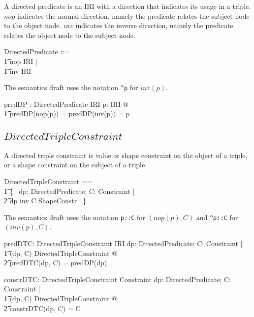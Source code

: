 \documentclass{article}
\begin{document}
A directed predicate is an IRI with a direction that indicates its usage in a triple. 
$nop$ indicates the normal direction, namely the predicate relates the subject node to the object node. 
$inv$ indicates the inverse direction, namely the predicate relates the object node to the subject node.
\begin{zed}
	DirectedPredicate ::= \\
\t1		nop \ldata IRI \rdata | \\
\t1		inv \ldata IRI \rdata
\end{zed}

The semantics draft uses the notation {\tt \verb+^+p} for $inv(p)$.

\begin{axdef}
	predDP : DirectedPredicate \fun IRI
\where
	\forall p: IRI @ \\
\t1		predDP(nop(p)) = predDP(inv(p)) = p
\end{axdef}

\subsection{$DirectedTripleConstraint$}
A directed triple constraint is value or shape constraint on the object of a triple, or a shape constraint on the subject of a triple.
\begin{zed}
	DirectedTripleConstraint == \\
\t1		\{~ dp: DirectedPredicate; C: Constraint | \\
\t2			dp \in \ran inv \implies C \in ShapeConstr ~\}
\end{zed}

The semantics draft uses the notation {\tt p::C} for $(nop(p),C)$ and {\tt \verb+^+p::C} for $(inv(p),C)$.

\begin{axdef}
	predDTC: DirectedTripleConstraint \fun IRI
\where
	\forall dp: DirectedPredicate; C: Constraint | \\
\t1		(dp, C) \in DirectedTripleConstraint @ \\
\t2			predDTC(dp, C) = predDP(dp)
\end{axdef}

\begin{axdef}
	constrDTC: DirectedTripleConstraint \fun Constraint
\where
	\forall dp: DirectedPredicate; C: Constraint | \\
\t1		(dp, C) \in DirectedTripleConstraint @ \\
\t2			constrDTC(dp, C) = C
\end{axdef}
\end{document}
